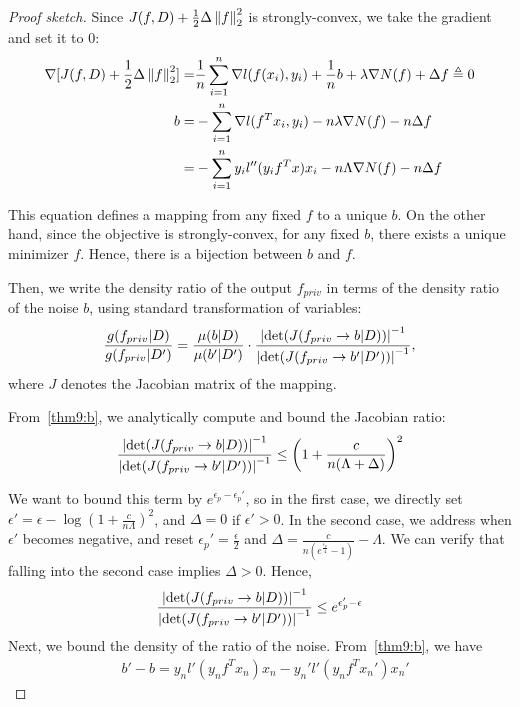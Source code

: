 \documentclass{article} %
\begin{document}
\begin{proof}[Proof sketch]
Since $J(f, D) + \frac{1}{2}\Delta \left\lVert f\right\rVert_2^2$ is strongly-convex, we take the gradient and set it to 0:
\begin{align}
\nabla [J(f, D) +  \frac{1}{2}\Delta \left\lVert f\right\rVert_2^2]= & \frac{1}{n}\sum_{i=1}^n \nabla l(f(x_i), y_i) + \frac{1}{n} b+ \lambda \nabla N(f) + \Delta f  \triangleq 0\nonumber\\
b =&  -\sum_{i=1}^n \nabla l(f^Tx_i, y_i) -n \lambda \nabla N(f) - n\Delta f\nonumber\\
= & -\sum_{i=1}^n y_i l''(y_i f^T x) x_i - n\Lambda \nabla N(f) - n\Delta f\label{thm9:b}
\end{align}

This equation defines a mapping from any fixed $f$ to a unique $b$. On the other hand, since the objective is strongly-convex, for any fixed $b$, there exists a unique minimizer $f$. Hence, there is a bijection between $b$ and $f$.

Then, we write the density ratio of the output $f_{priv}$ in terms of the density ratio of the noise $b$, using standard transformation of variables:
\begin{align}
\frac{g(f_{priv} | D)}{g(f_{priv} | D')} = \frac{\mu(b | D)}{\mu(b' | D')} \cdot \frac{\left\lvert\det(J(f_{priv} \rightarrow b | D))\right\rvert^{-1}}{\left\lvert\det(J(f_{priv} \rightarrow b' | D'))\right\rvert^{-1}}, \label{thm9:main}
\end{align}
where $J$ denotes the Jacobian matrix of the mapping.

From~\eqref{thm9:b}, we analytically compute and bound the Jacobian ratio:
\begin{align*}\frac{\left\lvert\det(J(f_{priv} \rightarrow b | D))\right\rvert^{-1}}{\left\lvert\det(J(f_{priv} \rightarrow b' | D'))\right\rvert^{-1}} \le \left(1 + \frac{c}{n(\Lambda + \Delta)}\right)^2
\end{align*}

We want to bound this term by $e^{\epsilon_p - \epsilon_p'}$, so in the first case, we directly set $\epsilon' = \epsilon  - \log{(1 + \frac{c}{n\Lambda})^2}$, and $\Delta = 0$ if $\epsilon' > 0$. In the second case, we address when $\epsilon'$ becomes negative, and reset $\epsilon_p' = \frac{\epsilon}{2}$ and $\Delta = \frac{c}{n(e^{\frac{\epsilon_p}{4}}- 1)}- \Lambda$. We can verify that falling into the second case implies $\Delta > 0$. Hence,
\begin{align}
\frac{\left\lvert\det(J(f_{priv} \rightarrow b | D))\right\rvert^{-1}}{\left\lvert\det(J(f_{priv} \rightarrow b' | D'))\right\rvert^{-1}} \le e^{\epsilon_p' - \epsilon} \label{thm9:ratio_jacobian}
\end{align}
Next, we bound the density of the ratio of the noise. From~\eqref{thm9:b}, we have
\begin{align*}
& b' - b = y_n l'(y_n f^T x_n) x_n - y_n' l'(y_n f^T x_n') x_n'
\end{align*}


\end{proof}
\end{document}
